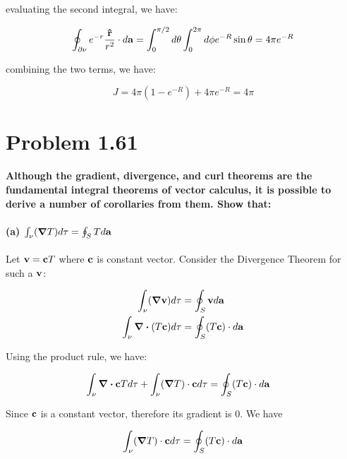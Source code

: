 \documentclass{article}
\numberwithin{equation}{section}
\newcommand{\vbh}[1]{\vb{\hat{#1}}}
\begin{document}
evaluating the second integral, we have:

\begin{equation}
    \oint_{\partial \nu} e^{-r} \frac{\vbh{r}}{r^2} \cdot d \vb{a} = \int_0^{\pi/2} d \theta \int_0^{2\pi} d \phi e^{-R} \sin \theta = 4 \pi e^{-R}
\end{equation}

combining the two terms, we have:

\begin{equation}
    J = 4 \pi (1 - e^{-R}) + 4 \pi e^{-R} = 4\pi 
\end{equation}

\section{Problem 1.61}

\textbf{Although the gradient, divergence, and curl theorems are the fundamental integral theorems of vector calculus, it is possible to derive a number of corollaries from them. Show that:}

\paragraph{(a) $\int_\nu (\grad T) d \tau = \oint_S T d \vb{a}$ \\}

Let $\vb{v = c}T$ where $\vb{c}$ is constant vector. Consider the Divergence Theorem for such a $\vb{v}$:

\begin{equation}
\begin{split}
    \int_\nu (\grad \vb{v}) d \tau &= \oint_S \vb{v} d \vb{a} \\
    \int_\nu \div (T \vb{c})  d \tau &= \oint_S (T \vb{c}) \cdot d \vb{a}
    \end{split}
\end{equation}

Using the product rule, we have:

\begin{equation}
    \begin{split}
        \int_\nu \div \vb{c} T d \tau + \int_\nu (\grad T) \cdot \vb{c} d \tau &= \oint_S (T \vb{c}) \cdot d \vb{a} 
    \end{split}
\end{equation}

Since $\vb{c}$ is a constant vector, therefore its gradient is $0$. We have 

\begin{equation}
     \int_\nu (\grad T) \cdot \vb{c} d \tau = \oint_S (T \vb{c}) \cdot d \vb{a}
\end{equation}
\end{document}
